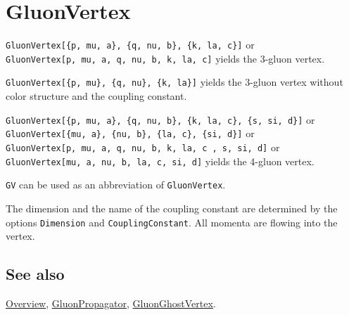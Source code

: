 \documentclass[../FeynCalcManual.tex]{subfiles}
\begin{document}
\hypertarget{gluonvertex}{
\section{GluonVertex}\label{gluonvertex}}

\texttt{GluonVertex[\allowbreak{}\{\allowbreak{}p,\ \allowbreak{}mu,\ \allowbreak{}a\},\ \allowbreak{}\{\allowbreak{}q,\ \allowbreak{}nu,\ \allowbreak{}b\},\ \allowbreak{}\{\allowbreak{}k,\ \allowbreak{}la,\ \allowbreak{}c\}]}
or
\texttt{GluonVertex[\allowbreak{}p,\ \allowbreak{}mu,\ \allowbreak{}a,\ \allowbreak{}q,\ \allowbreak{}nu,\ \allowbreak{}b,\ \allowbreak{}k,\ \allowbreak{}la,\ \allowbreak{}c]}
yields the 3-gluon vertex.

\texttt{GluonVertex[\allowbreak{}\{\allowbreak{}p,\ \allowbreak{}mu\},\ \allowbreak{}\{\allowbreak{}q,\ \allowbreak{}nu\},\ \allowbreak{}\{\allowbreak{}k,\ \allowbreak{}la\}]}
yields the 3-gluon vertex without color structure and the coupling
constant.

\texttt{GluonVertex[\allowbreak{}\{\allowbreak{}p,\ \allowbreak{}mu,\ \allowbreak{}a\},\ \allowbreak{}\{\allowbreak{}q,\ \allowbreak{}nu,\ \allowbreak{}b\},\ \allowbreak{}\{\allowbreak{}k,\ \allowbreak{}la,\ \allowbreak{}c\},\ \allowbreak{}\{\allowbreak{}s,\ \allowbreak{}si,\ \allowbreak{}d\}]}
or
\texttt{GluonVertex[\allowbreak{}\{\allowbreak{}mu,\ \allowbreak{}a\},\ \allowbreak{}\{\allowbreak{}nu,\ \allowbreak{}b\},\ \allowbreak{}\{\allowbreak{}la,\ \allowbreak{}c\},\ \allowbreak{}\{\allowbreak{}si,\ \allowbreak{}d\}]}
or
\texttt{GluonVertex[\allowbreak{}p,\ \allowbreak{}mu,\ \allowbreak{}a,\ \allowbreak{}q,\ \allowbreak{}nu,\ \allowbreak{}b,\ \allowbreak{}k,\ \allowbreak{}la,\ \allowbreak{}c ,\ \allowbreak{}s,\ \allowbreak{}si,\ \allowbreak{}d]}
or
\texttt{GluonVertex[\allowbreak{}mu,\ \allowbreak{}a,\ \allowbreak{}nu,\ \allowbreak{}b,\ \allowbreak{}la,\ \allowbreak{}c,\ \allowbreak{}si,\ \allowbreak{}d]}
yields the 4-gluon vertex.

\texttt{GV} can be used as an abbreviation of \texttt{GluonVertex}.

The dimension and the name of the coupling constant are determined by
the options \texttt{Dimension} and \texttt{CouplingConstant}. All
momenta are flowing into the vertex.

\subsection{See also}

\hyperlink{toc}{Overview}, \hyperlink{gluonpropagator}{GluonPropagator},
\hyperlink{gluonghostvertex}{GluonGhostVertex}.
\end{document}
